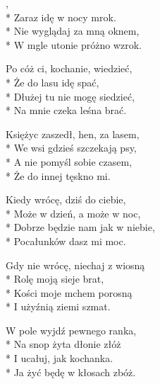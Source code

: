 \begin{lyrics}[longestline={Dziś do ciebie przyjść nie mogę,}]

,\\*
Zaraz idę w nocy mrok.\\*
Nie wyglądaj za mną oknem,\\*
W mgle utonie próżno wzrok.

Po cóż ci, kochanie, wiedzieć,\\*
Że do lasu idę spać,\\*
Dłużej tu nie mogę siedzieć,\\*
Na mnie czeka leśna brać.

Księżyc zaszedł, hen, za lasem,\\*
We wsi gdzieś szczekają psy,\\*
A nie pomyśl sobie czasem,\\*
Że do innej tęskno mi.

Kiedy wrócę, dziś do ciebie,\\*
Może w dzień, a może w noc,\\*
Dobrze będzie nam jak w niebie,\\*
Pocałunków dasz mi moc.

Gdy nie wrócę, niechaj z wiosną\\*
Rolę moją sieje brat,\\*
Kości moje mchem porosną\\*
I użyźnią ziemi szmat.

W pole wyjdź pewnego ranka,\\*
Na snop żyta dłonie złóż\\*
I ucałuj, jak kochanka.\\*
Ja żyć będę w kłosach zbóż.
\end{lyrics}





